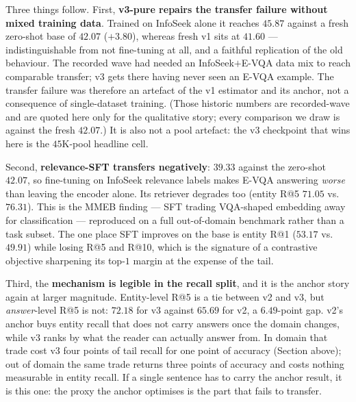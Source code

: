Three things follow. First, \textbf{v3-pure repairs the transfer failure without mixed training
data}. Trained on InfoSeek alone it reaches $45.87$ against a fresh zero-shot base of $42.07$
($+3.80$), whereas fresh v1 sits at $41.60$ --- indistinguishable from not fine-tuning at all, and
a faithful replication of the old behaviour. The recorded wave had needed an InfoSeek$+$E-VQA data
mix to reach comparable transfer; v3 gets there having never seen an E-VQA example. The transfer
failure was therefore an artefact of the v1 estimator and its anchor, not a consequence of
single-dataset training. (Those historic numbers are recorded-wave and are quoted here only for
the qualitative story; every comparison we draw is against the fresh $42.07$.) It is also not a
pool artefact: the v3 checkpoint that wins here is the $45$K-pool headline cell.

Second, \textbf{relevance-SFT transfers negatively}: $39.33$ against the zero-shot $42.07$, so
fine-tuning on InfoSeek relevance labels makes E-VQA answering \emph{worse} than leaving the
encoder alone. Its retriever degrades too (entity R@5 $71.05$ vs.\ $76.31$). This is the MMEB
finding --- SFT trading VQA-shaped embedding away for classification --- reproduced on a full
out-of-domain benchmark rather than a task subset. The one place SFT improves on the base is
entity R@1 ($53.17$ vs.\ $49.91$) while losing R@5 and R@10, which is the signature of a
contrastive objective sharpening its top-$1$ margin at the expense of the tail.

Third, the \textbf{mechanism is legible in the recall split}, and it is the anchor story again at
larger magnitude. Entity-level R@5 is a tie between v2 and v3, but \emph{answer}-level R@5 is not:
$72.18$ for v3 against $65.69$ for v2, a $6.49$-point gap. v2's anchor buys entity recall that
does not carry answers once the domain changes, while v3 ranks by what the reader can actually
answer from. In domain that trade cost v3 four points of tail recall for one point of accuracy
(Section above); out of domain the same trade returns three points of accuracy and costs nothing
measurable in entity recall. If a single sentence has to carry the anchor result, it is this one:
the proxy the anchor optimises is the part that fails to transfer.

